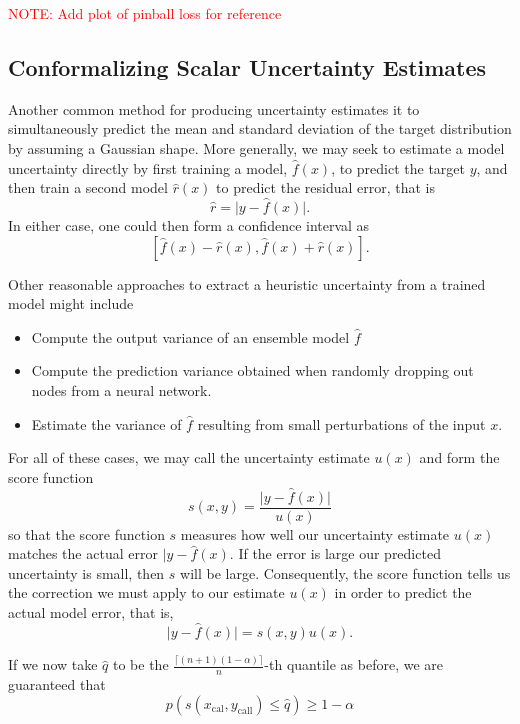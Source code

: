 \textcolor{red}{NOTE: Add plot of pinball loss for reference}

\subsection{Conformalizing Scalar Uncertainty Estimates}

Another common method for producing uncertainty estimates it to simultaneously
predict the mean and standard deviation of the target distribution by assuming a
Gaussian shape. More generally, we may seek to estimate a model uncertainty
directly by first training a model, $\hat{f}(x)$, to predict the target $y$, and
then train a second model $\hat{r}(x)$ to predict the residual error, that is
\begin{equation}
  \hat{r} = \lvert y - \hat{f}(x)\rvert.
\end{equation}
In either case, one could then form a confidence interval as
\begin{equation}
  \left[ \hat{f}(x) - \hat{r}(x), \hat{f}(x) + \hat{r}(x) \right].
\end{equation}

Other reasonable approaches to extract a heuristic uncertainty from a trained
model might include
\begin{itemize}
\item Compute the output variance of an ensemble model $\hat{f}$
\item Compute the prediction variance obtained when randomly dropping out nodes from a neural network.
\item Estimate the variance of $\hat{f}$ resulting from small perturbations of the input $x$.
\end{itemize}
For all of these cases, we may call the uncertainty estimate $u(x)$ and form the
score function
\begin{equation}
  s(x,y) = \frac{\lvert y - \hat{f}(x) \rvert}{u(x)}
\end{equation}
so that the score function $s$ measures how well our uncertainty estimate $u(x)$
matches the actual error $\lvert y -\hat{f}(x)$. If the error is large our
predicted uncertainty is small, then $s$ will be large. Consequently, the score
function tells us the correction we must apply to our estimate $u(x)$ in order
to predict the actual model error, that is,
\begin{equation}
  \lvert y - \hat{f}(x) \rvert = s(x,y)u(x).
\end{equation}

If we now take $\hat{q}$ to be the $\frac{\lceil(n+1)(1-\alpha) \rceil}{n}$-th
quantile as before, we are guaranteed that
\begin{equation}
  p(s(x_{\text{cal}}, y_{\text{call}}) \leq \hat{q}) \geq 1 - \alpha
\end{equation}

